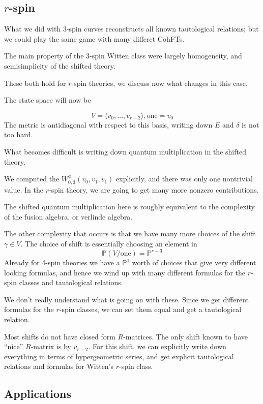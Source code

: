 \documentclass{amsart}
\theoremstyle{definition}
\newcommand{\proj}{\mathbb{P}}
\newcommand{\one}{\text{one}}
\begin{document}
\subsection{$r$-spin}
What we did with $3$-spin curves reconstructs all known tautological relations; but we could play the same game with many differet CohFTs.

The main property of the 3-spin Witten class were largely homogeneity, and semisimplicity of the shifted theory.

These both hold for $r$-spin theories, we discuss now what changes in this case.

The state space will now be

$$V=\langle v_0,\dots, v_{r-2}\rangle, \one=v_0$$
The metric is antidiagonal with respect to this basis, writing down $E$ and $\delta$ is not too hard.

What becomes difficult is writing down quantum multiplication in the shifted theory.

We computed the $W^{\phi}_{0,3}(v_0,v_1,v_1)$ explicitly, and there was only one nontrivial value.  In the $r$-spin theory, we are going to get many more nonzero contributions.

The shifted quantum multiplication here is roughly equivalent to the complexity of the fusion algebra, or verlinde algebra.

The other complexity that occurs is that we have many more choices of the shift $\gamma\in V$.  The choice of shift is essentially choosing an element in 
$$\proj(V/\one)=\proj^{r-3}$$
Already for 4-spin theories we have a $\proj^1$ worth of choices that give very different looking formulas, and hence we wind up with many different formulas for the $r$-spin classes and tautological relations.

We don't really understand what is going on with these.  Since we get different formulas for the $r$-spin classes, we can set them equal and get a tautological relation.

Most shifts do not have closed form $R$-matrices.  The only shift known to have ``nice'' $R$-matrix is by $v_{r-2}$.  For this shift, we can explicitly write down everything in terms of hypergeometric series, and get explicit tautological relations and formulas for Witten's $r$-spin class.

\subsection{Applications}
\end{document}
